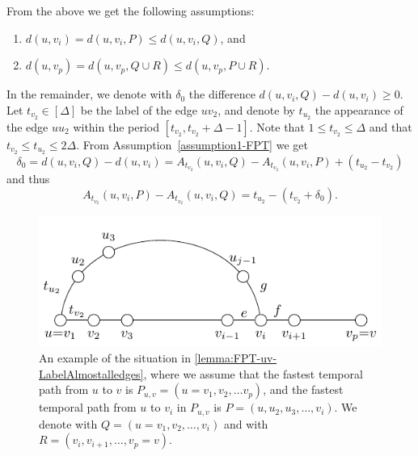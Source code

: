 \documentclass[a4paper,UKenglish,cleveref, autoref, thm-restate]{lipics-v2021}
\begin{document}
From the above we get the following assumptions:
	\begin{enumerate}
		\item \label{assumption1-FPT} $d(u,v_{i})=d(u,v_{i},P)\leq d(u,v_{i},Q)$, and
		\item \label{assumption2-FPT} $d(u,v_p)=d(u,v_p,Q\cup R)\leq d(u,v_p,P\cup R)$.
	\end{enumerate}
In the remainder, we denote with $\delta_{0}$ the difference $d(u,v_{i},Q) - d(u,v_{i})\geq 0$.
%
 Let $t_{v_2}\in [\Delta]$ be the label of the edge $uv_2$,
	and denote by $t_{u_{2}}$ the appearance of the edge $uu_{2}$ within the
	period $[t_{v_2},t_{v_2}+\Delta -1]$. Note that $1\leq t_{v_2}\leq
	\Delta $ and that $t_{v_2}\leq t_{u_{2}}\leq 2\Delta $. 
    From Assumption~\ref{assumption1-FPT} we get
	\begin{equation*}
		\delta
		_{0}=d(u,v_{i},Q)-d(u,v_{i})=A_{t_{v_2}}(u,v_{i},Q)-A_{t_{v_2}}(u,v_{i},P)+\left( t_{u_{2}}-t_{v_2}\right)
	\end{equation*}%
	and thus%
	\begin{equation}
		A_{t_{v_2}}(u,v_{i},P)-A_{t_{v_2}}(u,v_{i},Q)=t_{u_{2}}-(t_{v_2}+\delta _{0}).
		\label{basic-eq-1}
	\end{equation}

\begin{figure}[t]
	\centering
	\includegraphics{fig-lemma}
	\caption{An example of the situation in \cref{lemma:FPT-uv-LabelAlmostalledges},
		where we assume that the fastest temporal path from $u$ to $v$ is $P_{u,v} = (u=v_1, v_2, \dots v_p)$,
		and the fastest temporal path from $u$ to $v_i$ in $P_{u,v}$ is $P = (u, u_2, u_3, \dots, v_i)$.
		We denote with $Q = (u=v_1, v_2, \dots, v_i)$ and with $R = (v_i, v_{i+1}, \dots, v_p=v)$.
		\label{fig:FPT-uv-Labelalledges}}
\end{figure}
 
\end{document}

